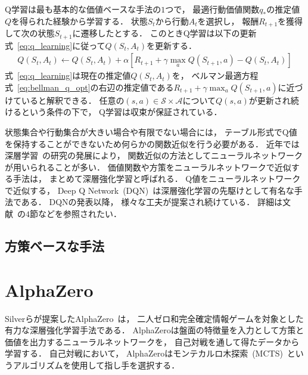 Q学習は最も基本的な価値ベースな手法の$1$つで， 最適行動価値関数$q_*$の推定値$Q$を得られた経験から学習する．
状態$S_t$から行動$A_t$を選択し， 報酬$R_{t+1}$を獲得して次の状態$S_{t+1}$に遷移したとする．
このときQ学習は以下の更新式~\ref{eq:q_learning}に従って$Q(S_t, A_t)$を更新する．
\begin{align}
  \label{eq:q_learning}
  Q(S_t, A_t) \leftarrow Q(S_t, A_t) + \alpha [R_{t+1} + \gamma \max_a Q(S_{t+1}, a) - Q(S_t, A_t)] 
\end{align}
式~\ref{eq:q_learning}は現在の推定値$Q(S_t, A_t)$を， ベルマン最適方程式~\ref{eq:bellman_q_opt}の右辺の推定値である$R_{t+1} + \gamma \max_a Q(S_{t+1}, a)$に近づけていると解釈できる．
任意の$(s, a) \in \mathcal{S} \times \mathcal{A}$について$Q(s,a)$が更新され続けるという条件の下で， Q学習は収束が保証されている．

状態集合や行動集合が大きい場合や有限でない場合には， テーブル形式でQ値を保持することができないため何らかの関数近似を行う必要がある．
近年では深層学習~\cite{DeepLearning}の研究の発展により， 関数近似の方法としてニューラルネットワークが用いられることが多い．
価値関数や方策をニューラルネットワークで近似する手法は， まとめて深層強化学習と呼ばれる．
Q値をニューラルネットワークで近似する， Deep Q Network~(DQN)~\cite{DQN}は深層強化学習の先駆けとして有名な手法である． 
DQNの発表以降， 様々な工夫が提案され続けている．
詳細は文献~\cite{deepRL}の$4$節などを参照されたい．

\subsection{方策ベースな手法}

\section{AlphaZero}
Silverらが提案したAlphaZero~\cite{AlphaZero}は， 二人ゼロ和完全確定情報ゲームを対象とした有力な深層強化学習手法である．
AlphaZeroは盤面の特徴量を入力として方策と価値を出力するニューラルネットワークを， 自己対戦を通して得たデータから学習する．
自己対戦において， AlphaZeroはモンテカルロ木探索~(MCTS)~というアルゴリズムを使用して指し手を選択する．

